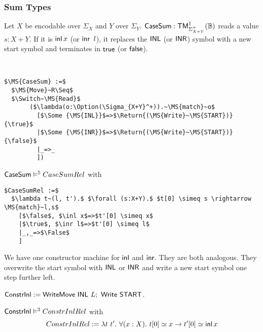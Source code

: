 \subsubsection{Sum Types}
\label{sec:match-sum}

Let $X$ be encodable over $\Sigma_X$ and $Y$ over $\Sigma_Y$.  $\mathsf{CaseSum} : \mathsf{TM}_{\Sigma_{X+Y}^+}^1(\mathbb{B})$ reads a value $s:X+Y$.  If it is
$\operatorname{\mathsf{inl}} x$ (or $\operatorname{\mathsf{inr}}~l$), it replaces the $\mathsf{INL}$ (or $\mathsf{INR}$) symbol with a new start symbol and terminates in $\mathsf{true}$ (or $\mathsf{false}$).

%
\begin{definition}[$\MS{CaseSum}$][CaseSum]
  \label{def:CaseSum}
  ~
  \small
\begin{lstlisting}[style=semicoqstyle]
$\MS{CaseSum} :=$
  $\MS{Move}~R\Seq$
  $\Switch~\MS{Read}$
       ($\lambda(o:\Option(\Sigma_{X+Y}^+)).~\MS{match}~o$
         [$\Some {\MS{INL}}$=>$\Return{(\MS{Write}~\MS{START})}{\true}$
         |$\Some {\MS{INR}}$=>$\Return{(\MS{Write}~\MS{START})}{\false}$
         |_=>_
         ])
\end{lstlisting}
\end{definition}

\begin{lemma}
  \label{lem:CaseSum_Realise}
  $\mathsf{CaseSum} \mathrel{\vDash^{5}} CaseSumRel$ with
\begin{lstlisting}[style=semicoqstyle]
$CaseSumRel :=$
  $\lambda t~(l, t').$ $\forall (s:X+Y).$ $t[0] \simeq s \rightarrow \MS{match}~l,s$
    [$\false$, $\inl x$=>$t'[0] \simeq x$
    |$\true$, $\inr l$=>$t'[0] \simeq l$
    |_,_=>$\False$
    ]
\end{lstlisting}
\end{lemma}

We have one constructor machine for $\operatorname{\mathsf{inl}}$ and $\operatorname{\mathsf{inr}}$.  They are both analogous.  They overwrite the start symbol with $\mathsf{INL}$ or $\mathsf{INR}$ and
write a new start symbol one step further left.
\begin{definition}
  \label{def:Constr_inl}
  $\mathsf{ConstrInl} := \mathsf{WriteMove}~\mathsf{INL}~L ;~ \mathsf{Write}~\mathsf{START}$.
\end{definition}
\begin{lemma}
  \label{lem:Constr_inl_Sem}
  $\mathsf{ConstrInl} \mathrel{\vDash^{3}} ConstrInlRel$ with
  \[
    ConstrInlRel := \lambda t~t'.~\forall(x:X).~t[0] \simeq x \rightarrow t'[0] \simeq \operatorname{\mathsf{inl}} x
  \]
\end{lemma}

